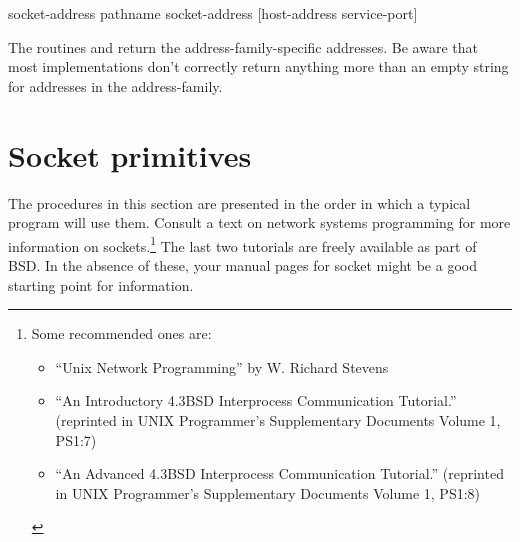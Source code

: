  {socket-address} {pathname}
 {socket-address} {[host-address service-port]}
\begin{desc}

The routines  and
 return the address-family-specific addresses.
Be aware that most implementations don't correctly return anything more
than an empty string for addresses in the {\Unix} address-family.
\end{desc}

\section{Socket primitives}

The procedures in this section are presented in the order in which a
typical program will use them. Consult a text on network systems
programming for more information on sockets.\footnote{
Some recommended ones are: 

\begin{itemize}

\item ``Unix Network Programming'' by W. Richard Stevens

\item ``An Introductory 4.3BSD Interprocess Communication Tutorial.''
(reprinted in UNIX Programmer's Supplementary Documents Volume 1, PS1:7)

\item ``An Advanced 4.3BSD Interprocess Communication Tutorial.''
(reprinted in UNIX Programmer's Supplementary Documents Volume 1, PS1:8)

\end{itemize}
}
The last two tutorials are freely available as part of BSD. In the
absence of these, your {\Unix} manual pages for socket might be a good
starting point for information.

